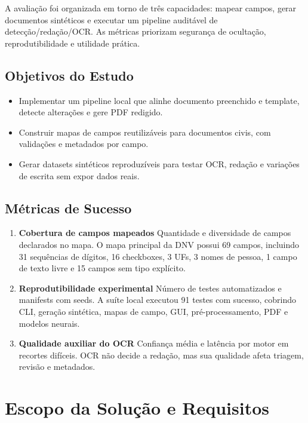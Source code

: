 \documentclass[12pt,a4paper]{article}
\begin{document}
A avaliação foi organizada em torno de três capacidades: mapear campos, gerar documentos sintéticos e executar um pipeline auditável de detecção/redação/OCR. As métricas priorizam segurança de ocultação, reprodutibilidade e utilidade prática.

\subsection{Objetivos do Estudo}

\begin{itemize}
    \item{} Implementar um pipeline local que alinhe documento preenchido e template, detecte alterações e gere PDF redigido.
    \item{} Construir mapas de campos reutilizáveis para documentos civis, com validações e metadados por campo.
    \item{} Gerar datasets sintéticos reproduzíveis para testar OCR, redação e variações de escrita sem expor dados reais.
\end{itemize}

\subsection{Métricas de Sucesso}

\begin{enumerate}
    \item \textbf{Cobertura de campos mapeados}
    Quantidade e diversidade de campos declarados no mapa. O mapa principal da DNV possui 69 campos, incluindo 31 sequências de dígitos, 16 checkboxes, 3 UFs, 3 nomes de pessoa, 1 campo de texto livre e 15 campos sem tipo explícito.

    \item \textbf{Reprodutibilidade experimental}
    Número de testes automatizados e manifests com seeds. A suíte local executou 91 testes com sucesso, cobrindo CLI, geração sintética, mapas de campo, GUI, pré-processamento, PDF e modelos neurais.

    \item \textbf{Qualidade auxiliar do OCR}
    Confiança média e latência por motor em recortes difíceis. OCR não decide a redação, mas sua qualidade afeta triagem, revisão e metadados.
\end{enumerate}

\section{Escopo da Solução e Requisitos}
\label{sec:escopo}
\end{document}

